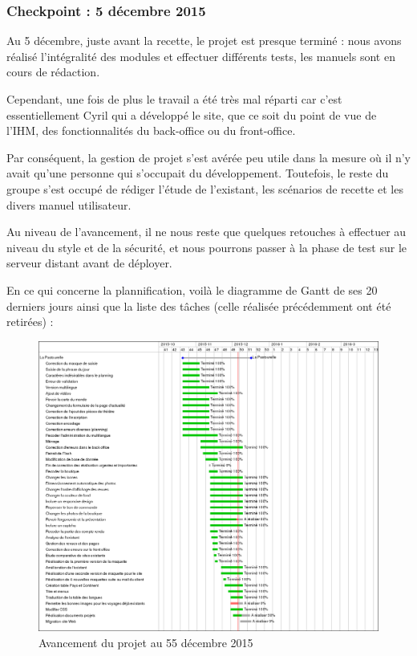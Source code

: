 \documentclass[11pt]{report}
\begin{document}
\subsubsection*{Checkpoint : 5 décembre 2015}
\par Au 5 décembre, juste avant la recette, le projet est presque terminé : nous
avons réalisé l'intégralité des modules et effectuer différents tests, les
manuels sont en cours de rédaction. \\
\par Cependant, une fois de plus le travail a été très mal réparti car c'est
essentiellement Cyril qui a développé le site, que ce soit du point de vue de
l'IHM, des fonctionnalités du back-office ou du front-office. \\
\par Par conséquent, la gestion de projet s'est avérée peu utile dans la mesure
où il n'y avait qu'une personne qui s'occupait du développement. Toutefois, le
reste du groupe s'est occupé de rédiger l'étude de l'existant, les scénarios de
recette et les divers manuel utilisateur.\\
\par Au niveau de l'avancement, il ne nous reste que quelques retouches à
effectuer au niveau du style et de la sécurité, et nous pourrons passer à la
phase de test sur le serveur distant avant de déployer.\\
\par En ce qui concerne la plannification, voilà le diagramme de Gantt de ses 20
derniers jours ainsi que la liste des tâches (celle réalisée précédemment ont
été retirées) :


\begin{landscape}
\begin{figure}[t]
    \caption{Avancement du projet au 55 décembre 2015}
   \includegraphics[scale=0.5]{include/gantt5-12.png}
\end{figure}
\end{landscape}
\end{document}
